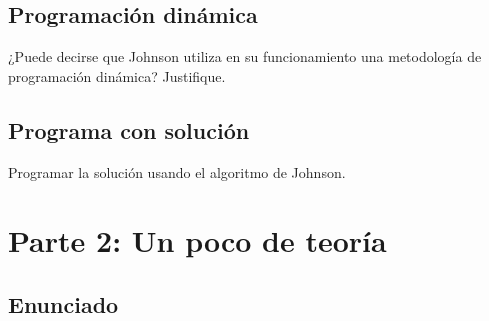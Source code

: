 \documentclass[titlepage,a4paper]{article}
\begin{document}
\newpage\subsection{Programación dinámica}\label{sec:parte1_6}
\begin{tcolorbox}[colback=blue!5!white,colframe=blue!75!black,title=Enunciado 1.6]
    ¿Puede decirse que Johnson utiliza en su funcionamiento una metodología de programación dinámica? Justifique.
\end{tcolorbox}

\newpage\subsection{Programa con solución}\label{sec:parte1_7}
\begin{tcolorbox}[colback=blue!5!white,colframe=blue!75!black,title=Enunciado 1.7]
    Programar la solución usando el algoritmo de Johnson.
\end{tcolorbox}




\setcounter{section}{1}%
\renewcommand{\thesection}{P\arabic{section}}%

\newpage\section{Parte 2: Un poco de teoría}\label{sec:parte2}

\setcounter{subsection}{0}%
\renewcommand{\thesubsection}{\alph{subsection}}%

\subsection{Enunciado}
\end{document}
